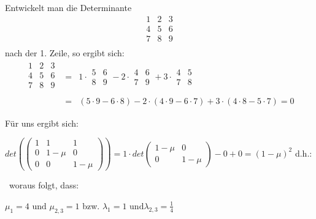 \begin{uebsp}
\begin{Answer}
\begin{uebsp_theory}
    Entwickelt man die Determinante
    \[\begin{array}{|ccc|}
        1 & 2 & 3 \\
        4 & 5 & 6 \\
        7 & 8 & 9 \\
    \end{array}\]
    nach der 1. Zeile, so ergibt sich:
    \begin{eqnarray*}\begin{array}{|ccc|}
        1 & 2 & 3 \\
        4 & 5 & 6 \\
        7 & 8 & 9 \\
    \end{array}&=&1\cdot \begin{array}{|cc|}5 & 6\\8&9\end{array}-2\cdot \begin{array}{|cc|}4 & 6\\7&9\end{array}+3\cdot \begin{array}{|cc|}4 & 5\\7&8\end{array}\\
    &=&(5\cdot 9-6\cdot 8)-2\cdot(4\cdot 9-6\cdot 7)+3\cdot (4\cdot 8-5\cdot 7)=0
\end{eqnarray*}
\end{uebsp_theory}

{
F\"ur uns ergibt sich: \ }





{
 $\mathit{det}(\left(\begin{matrix}1&1&1\\0&1-\mu &0\\0&0&1-\mu
\end{matrix}\right))=1\cdot \mathit{det}(\begin{matrix}1-\mu
&0\\0&1-\mu \end{matrix})-0+0=(1-\mu )^{2}$  d.h.:}

{
\ woraus folgt, dass:}

{
 $\mu _{1}=4\text{ und }\mu _{2,3}=1$  bzw.  $\lambda _{1}=1\text{ und
}\lambda _{2,3}=\frac{1}{4}$ }




\end{Answer}
\end{uebsp}

